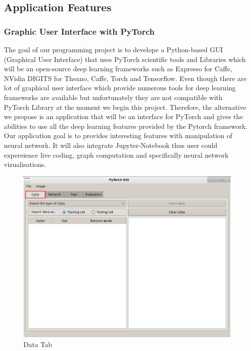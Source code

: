 \subsection{Application Features}


\subsubsection{Graphic User Interface with PyTorch}
 
The goal of our programming project is to develope  a Python-based GUI (Graphical User Interface) 
that uses PyTorch scientific tools and  Libraries which will be an open-source deep learning frameworks such as Expresso  for  Caffe,  NVidia  DIGITS  for  Theano,  Caffe,  Torch  and  Tensorflow.   Even though there are lot  of  graphical  user
interface which provide numerous tools for deep learning frameworks are available but unfortunately they are not
compatible with PyTorch Library at the moment we begin this project. Therefore, the alternative we propose is
an application that will be an interface for PyTorch and gives the abilities to use all the deep learning features
provided by the Pytorch framework.
Our application goal is to provides interesting features with manipulation of neural network. It will also integrate
Jupyter-Notebook thus user could expereience live coding, graph computation and specifically neural network
vizualisations.

\begin{figure}[!ht]
    \center 
    \includegraphics[scale=0.5]{figures/app_screen_shoots/Data_tab.png}
    \caption{Data Tab}
\end{figure}

